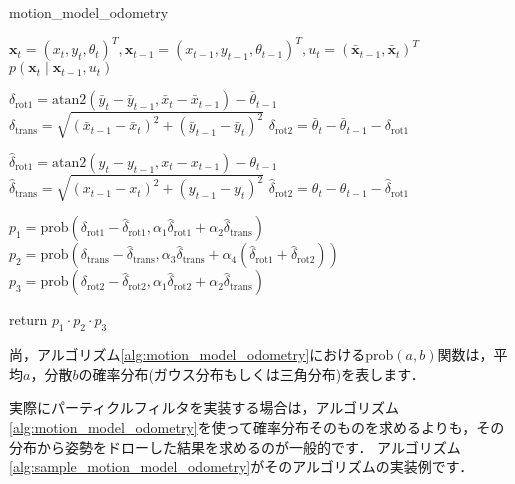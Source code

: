 \documentclass[{../../master}]{subfiles}
\begin{document}
\begin{algorithm}
  \caption{motion\_model\_odometry}
  \label{alg:motion_model_odometry}
  \begin{algorithmic}[1]
    \REQUIRE $\bm{x}_{t} = (x_{t}, y_{t}, \theta_{t})^{T}, \bm{x}_{t-1} = (x_{t-1}, y_{t-1}, \theta_{t-1})^{T}, u_{t} = (\bar{\bm{x}}_{t-1}, \bar{\bm{x}}_{t})^{T}$
    \ENSURE $p(\bm{x}_{t} \mid \bm{x}_{t-1}, u_{t})$

    \STATE $\delta_{\text{rot1}} = \text{atan2}(\bar{y}_{t} - \bar{y}_{t-1}, \bar{x}_{t} - \bar{x}_{t-1}) - \bar{\theta}_{t-1}$
    \STATE $\delta_{\text{trans}} = \sqrt{(\bar{x}_{t-1} - \bar{x}_{t})^2 + (\bar{y}_{t-1} - \bar{y}_{t})^2}$
    \STATE $\delta_{\text{rot2}} = \bar{\theta}_{t} - \bar{\theta}_{t-1} - \delta_{\text{rot1}}$

    \STATE $\hat{\delta}_{\text{rot1}} = \text{atan2}(y_{t} - y_{t-1}, x_{t} - x_{t-1}) - \theta_{t-1}$
    \STATE $\hat{\delta}_{\text{trans}} = \sqrt{(x_{t-1} - x_{t})^2 + (y_{t-1} - y_{t})^2}$
    \STATE $\hat{\delta}_{\text{rot2}} = \theta_{t} - \theta_{t-1} - \hat{\delta}_{\text{rot1}}$

    \STATE $p_1 = \text{prob}(\delta_{\text{rot1}} - \hat{\delta}_{\text{rot1}}, \alpha_1 \hat{\delta}_{\text{rot1}} + \alpha_2 \hat{\delta}_{\text{trans}})$
    \STATE $p_2 = \text{prob}(\delta_{\text{trans}} - \hat{\delta}_{\text{trans}}, \alpha_3 \hat{\delta}_{\text{trans}} + \alpha_4 (\hat{\delta}_{\text{rot1}} + \hat{\delta}_{\text{rot2}}))$
    \STATE $p_3 = \text{prob}(\delta_{\text{rot2}} - \hat{\delta}_{\text{rot2}}, \alpha_1 \hat{\delta}_{\text{rot2}} + \alpha_2 \hat{\delta}_{\text{trans}})$

    \STATE return $p_1 \cdot p_2 \cdot p_3$
  \end{algorithmic}
\end{algorithm}

尚，アルゴリズム\ref{alg:motion_model_odometry}における$\text{prob}(a, b)$関数は，平均$a$，分散$b$の確率分布(ガウス分布もしくは三角分布)を表します．

実際にパーティクルフィルタを実装する場合は，アルゴリズム\ref{alg:motion_model_odometry}を使って確率分布そのものを求めるよりも，その分布から姿勢をドローした結果を求めるのが一般的です．
アルゴリズム\ref{alg:sample_motion_model_odometry}がそのアルゴリズムの実装例です．
\end{document}
